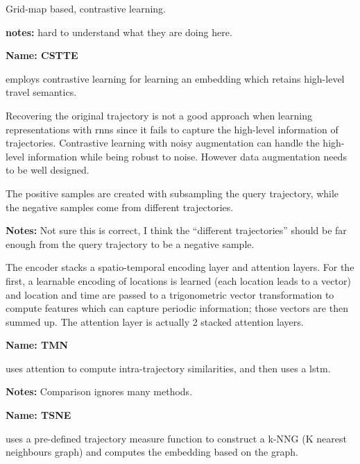 
\cite{ahmed2022deep} Grid-map based, contrastive learning. 

\textbf{notes:} hard to understand what they are doing here.


\textbf{Name: CSTTE}

\cite{lin2022contrastive} employs contrastive learning for learning an embedding which retains high-level travel semantics.

Recovering the original trajectory is not a good approach when learning representations with \glspl{rnn} since it fails to capture the high-level information of trajectories. Contrastive learning with noisy augmentation can handle the high-level information while being robust to noise. However data augmentation needs to be well designed. 

The positive samples are created with subsampling the query trajectory, while the negative samples come from different trajectories.

\textbf{Notes:} Not sure this is correct, I think the ``different trajectories'' should be far enough from the query trajectory to be a negative sample.

The encoder stacks a spatio-temporal encoding layer and attention layers. For the first, a learnable encoding of locations is learned (each location leads to a vector) and location and time are passed to a trigonometric vector transformation to compute features which can capture periodic information; those vectors are then summed up. The attention layer is actually 2 stacked attention layers.



\textbf{Name: TMN}

\cite{yang2022tmn} uses attention to compute intra-trajectory similarities, and then uses a \gls{lstm}.

\textbf{Notes:} Comparison ignores many methods.


\textbf{Name: TSNE}

\cite{ding2022tsne} uses a pre-defined trajectory measure function to construct a k-NNG (K nearest neighbours graph) and computes the embedding based on the graph.


